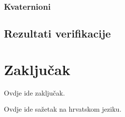\documentclass[times, utf8, diplomski, numeric]{templates/template}
\begin{document}
{{        \subsection{Kvaternioni}{
        }
    }

    \section{Rezultati verifikacije}{
    }
}

\chapter{Zaključak}{
    Ovdje ide zaključak.
}




\begin{sazetak}{
    Ovdje ide sažetak na hrvatskom jeziku.
}

\end{sazetak}

\begin{abstract}{
    Add abstract here.
}

\end{abstract}
\end{document}
